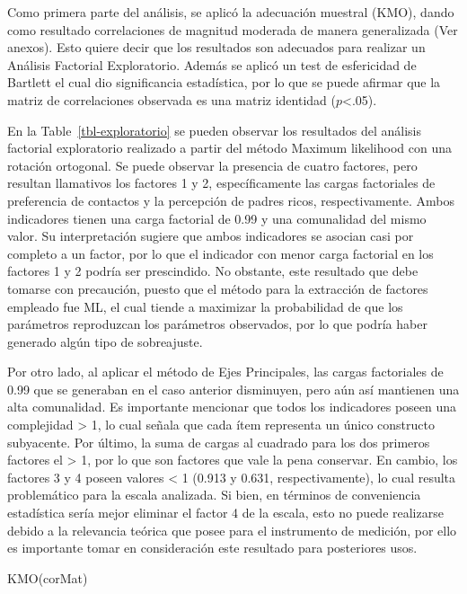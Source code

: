 \documentclass[
  12pt,
]{article}
\newenvironment{Shaded}{\begin{snugshade}}{\end{snugshade}}
\newcommand{\FunctionTok}[1]{\textcolor[rgb]{0.28,0.35,0.67}{#1}}
\newcommand{\NormalTok}[1]{\textcolor[rgb]{0.00,0.23,0.31}{#1}}
\begin{document}
\begin{longtable}[]
\end{longtable}

Como primera parte del análisis, se aplicó la adecuación muestral (KMO),
dando como resultado correlaciones de magnitud moderada de manera
generalizada (Ver anexos). Esto quiere decir que los resultados son
adecuados para realizar un Análisis Factorial Exploratorio. Además se
aplicó un test de esfericidad de Bartlett el cual dio significancia
estadística, por lo que se puede afirmar que la matriz de correlaciones
observada es una matriz identidad (\(p\)\textless.05).

En la Table~\ref{tbl-exploratorio} se pueden observar los resultados del
análisis factorial exploratorio realizado a partir del método Maximum
likelihood con una rotación ortogonal. Se puede observar la presencia de
cuatro factores, pero resultan llamativos los factores 1 y 2,
específicamente las cargas factoriales de preferencia de contactos y la
percepción de padres ricos, respectivamente. Ambos indicadores tienen
una carga factorial de 0.99 y una comunalidad del mismo valor. Su
interpretación sugiere que ambos indicadores se asocian casi por
completo a un factor, por lo que el indicador con menor carga factorial
en los factores 1 y 2 podría ser prescindido. No obstante, este
resultado que debe tomarse con precaución, puesto que el método para la
extracción de factores empleado fue ML, el cual tiende a maximizar la
probabilidad de que los parámetros reproduzcan los parámetros
observados, por lo que podría haber generado algún tipo de sobreajuste.

Por otro lado, al aplicar el método de Ejes Principales, las cargas
factoriales de 0.99 que se generaban en el caso anterior disminuyen,
pero aún así mantienen una alta comunalidad. Es importante mencionar que
todos los indicadores poseen una complejidad \textgreater{} 1, lo cual
señala que cada ítem representa un único constructo subyacente. Por
último, la suma de cargas al cuadrado para los dos primeros factores el
\textgreater{} 1, por lo que son factores que vale la pena conservar. En
cambio, los factores 3 y 4 poseen valores \textless{} 1 (0.913 y 0.631,
respectivamente), lo cual resulta problemático para la escala analizada.
Si bien, en términos de conveniencia estadística sería mejor eliminar el
factor 4 de la escala, esto no puede realizarse debido a la relevancia
teórica que posee para el instrumento de medición, por ello es
importante tomar en consideración este resultado para posteriores usos.

\begin{Shaded}
\begin{Highlighting}[]
\FunctionTok{KMO}\NormalTok{(corMat) }
\end{Highlighting}
\end{Shaded}
\end{document}
